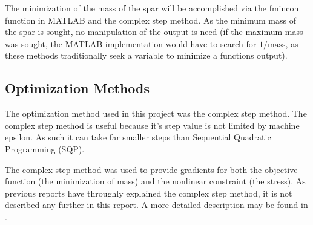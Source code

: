 \documentclass[12pt]{article}
\begin{document}

	
	
The minimization of the mass of the spar will be accomplished via the fmincon function in MATLAB and the complex step method. As the minimum mass of the spar is sought, no manipulation of the output is need (if the maximum mass was sought, the MATLAB implementation would have to search for $1/\text{mass}$, as these methods traditionally seek a variable to minimize a functions output). 
	
	

	
	
	\subsection{Optimization Methods}
	The optimization method used in this project was the complex step method. The complex step method is useful because it's step value is not limited by machine epsilon. As such it can take far smaller steps than Sequential Quadratic Programming (SQP)\cite{hoddinottP1}.\par 
	
	The complex step method was used to provide gradients for both the objective function (the minimization of mass) and the nonlinear constraint (the stress). As previous reports have throughly explained the complex step method, it is not described any further in this report. A more detailed description may be found in \cite{hoddinottP2}. 
	
\end{document}
